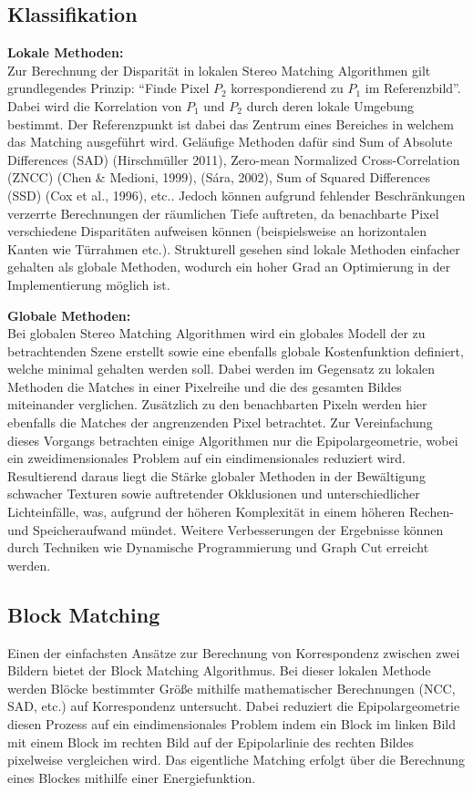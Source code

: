 \subsection{Klassifikation}
\label{subsec:stereo_matching_classification}
\textbf{Lokale Methoden:}\\
Zur Berechnung der Disparität in lokalen Stereo Matching Algorithmen gilt grundlegendes Prinzip: “Finde Pixel $P_2$ korrespondierend zu $P_1$ im Referenzbild”. Dabei wird die Korrelation von $P_1$ und $P_2$ durch deren lokale Umgebung bestimmt. Der Referenzpunkt ist dabei das Zentrum eines Bereiches in welchem das Matching ausgeführt wird. Geläufige Methoden dafür sind Sum of Absolute Differences (SAD) (Hirschmüller 2011), Zero-mean Normalized Cross-Correlation (ZNCC) (Chen & Medioni, 1999), (Sára, 2002), Sum of Squared Differences (SSD) (Cox et al., 1996), etc..
Jedoch können aufgrund fehlender Beschränkungen verzerrte Berechnungen der räumlichen Tiefe auftreten, da benachbarte Pixel verschiedene Disparitäten aufweisen können (beispielsweise an horizontalen Kanten wie Türrahmen etc.). Strukturell gesehen sind lokale Methoden einfacher gehalten als globale Methoden, wodurch ein hoher Grad an Optimierung in der Implementierung möglich ist.

\noindent
\textbf{Globale Methoden:}\\
Bei globalen Stereo Matching Algorithmen wird ein globales Modell der zu betrachtenden Szene erstellt sowie eine ebenfalls globale Kostenfunktion definiert, welche minimal gehalten werden soll. Dabei werden im Gegensatz zu lokalen Methoden die Matches in einer Pixelreihe und die des gesamten Bildes miteinander verglichen. Zusätzlich zu den benachbarten Pixeln werden hier ebenfalls die Matches der angrenzenden Pixel betrachtet. Zur Vereinfachung dieses Vorgangs betrachten einige Algorithmen nur die Epipolargeometrie, wobei ein zweidimensionales Problem auf ein eindimensionales reduziert wird. Resultierend daraus liegt die Stärke globaler Methoden in der Bewältigung schwacher Texturen sowie auftretender Okklusionen und unterschiedlicher Lichteinfälle, was, aufgrund der höheren Komplexität in einem höheren Rechen- und Speicheraufwand mündet. Weitere Verbesserungen der Ergebnisse können durch Techniken wie Dynamische Programmierung und Graph Cut erreicht werden.

\subsection{Block Matching}
\label{subsec:stereo_matching_bm}
Einen der einfachsten Ansätze zur Berechnung von Korrespondenz zwischen zwei Bildern bietet der Block Matching Algorithmus. Bei dieser lokalen Methode werden Blöcke bestimmter Größe mithilfe mathematischer Berechnungen (NCC, SAD, etc.) auf Korrespondenz untersucht. Dabei reduziert die Epipolargeometrie diesen Prozess auf ein eindimensionales Problem indem ein Block im linken Bild mit einem Block im rechten Bild auf der Epipolarlinie des rechten Bildes pixelweise vergleichen wird. Das eigentliche Matching erfolgt über die Berechnung eines Blockes mithilfe einer Energiefunktion.


